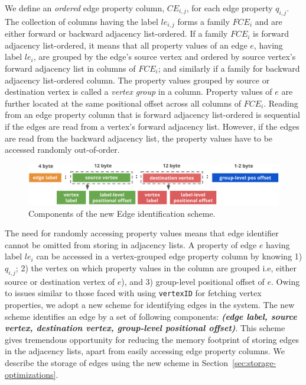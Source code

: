 We define an \emph{ordered} edge property column, $CE_{i,j}$, for each edge property $q_{i,j}$. The collection of columns having the label $le_{i,j}$ forms a family $FCE_i$ and are either forward or backward adjacency list-ordered. If a family $FCE_i$ is forward adjacency list-ordered, it means that all property values of an edge $e$, having label $le_i$, are grouped by the edge's source vertex and ordered by source vertex's forward adjacency list in columns of $FCE_i$; and similarly if a family for backward adjacency list-ordered column. The property values grouped by source or destination vertex is called a \emph{vertex group} in a column. Property values of $e$ are further located at the same positional offset across all columns of $FCE_i$. Reading from an edge property column that is forward adjacency list-ordered is sequential if the edges are read from a vertex's forward adjacency list. However, if the edges are read from the backward adjacency list, the property values have to be accessed randomly out-of-order.

\begin{figure}
	\vspace{-25pt}
	\hfill\includegraphics[scale=0.78]{img/edge-scheme}\hspace*{\fill}
	\captionsetup{justification=centering}
	\caption{Components of the new Edge identification scheme.}
	\label{fig:edge-scheme}
	\vspace{5pt}
\end{figure}

The need for randomly accessing property values means that edge identifier cannot be omitted from storing in adjacency lists. A property of edge $e$ having label $le_i$ can be accessed in a vertex-grouped edge property column by knowing 1) $q_{i,j}$; 2) the vertex on which property values in the column are grouped i.e, either source or destination vertex of $e$), and 3) group-level positional offset of $e$. Owing to issues similar to those faced with using \texttt{vertexID} for fetching vertex properties, we adopt a new scheme for identifying edges in the system. The new scheme identifies an edge by a set of following components: \textbf{\emph{(edge label, source vertex, destination vertex, group-level positional offset)}}. This scheme gives tremendous opportunity for reducing the memory footprint of storing edges in the adjacency lists, apart from easily accessing edge property columns. We describe the storage of edges using the new scheme in Section~\ref{sec:storage-optimizations}.

